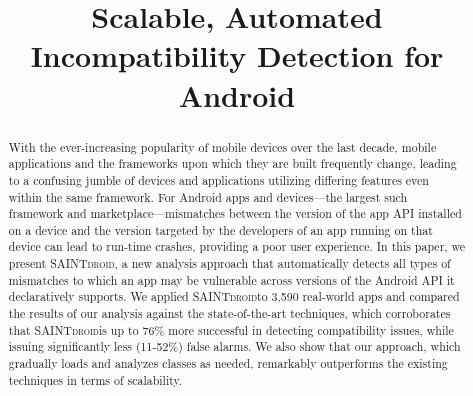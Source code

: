 \documentclass[sigconf,review]{acmart}
\makeatletter
\def \@approach{\textsc{SAINTdroid}}
\makeatother
\begin{document}
\title{Scalable, Automated Incompatibility Detection for Android} 


\begin{abstract}
With the ever-increasing popularity of mobile devices over
the last decade, mobile applications and the frameworks upon
which they are built frequently change, leading to a
confusing jumble of devices and applications utilizing
differing features even within the same framework. For
Android apps and devices---the largest such framework and
marketplace---mismatches between the version of the app API
installed on a device and the version targeted by the
developers of an app running on that device can lead to
run-time crashes, providing a poor user experience. In this
paper, we present \@approach, a new analysis approach that
automatically detects all types of mismatches to which an
app may be vulnerable across versions of the Android API it
declaratively supports. 
We applied \@approach to 3,590 real-world apps and compared the results of our analysis against the state-of-the-art techniques,
which corroborates that \@approach is up to 76\% more successful in detecting compatibility issues, while issuing significantly less (11-52\%) false alarms.
We also show that our approach, which gradually loads and analyzes classes as needed, remarkably outperforms the existing techniques in terms of scalability.

\end{abstract}


\maketitle











%
\balance


\end{document}
